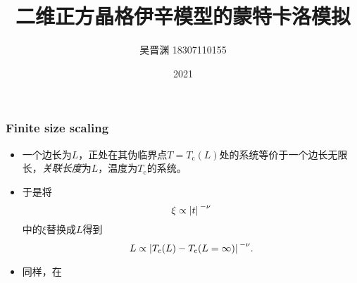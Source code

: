 \documentclass[UTF8]{ctexbeamer}
\title{二维正方晶格伊辛模型的蒙特卡洛模拟}
\author{吴晋渊 18307110155}
\institute{复旦大学物理学系}
\date{2021}
\begin{document}
\frame{\titlepage}

\begin{frame}
\frametitle{Finite size scaling}

\begin{itemize}
    \item 一个边长为$L$，正处在其伪临界点$T = T_\text{c}(L)$处的系统等价于一个边长无限长，\emph{关联长度}为$L$，温度为$T_\text{c}$的系统。 %
    \item 于是将
    \[
        \xi \propto \abs*{t}^{- \nu}
    \]
    中的$\xi$替换成$L$得到
    \begin{equation}
        L \propto \abs*{T_\text{c}(L) - T_\text{c}(L=\infty)}^{-\nu} .
    \end{equation}
    \item 同样，在
\end{itemize}    

\end{frame}
\end{document}
